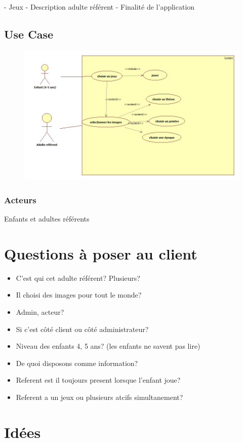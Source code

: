 \documentclass[12pt,a4paper]{report}
\begin{document}
- Jeux
- Description adulte référent
- Finalité de l'application



\section{Use Case}
\begin{figure}[!h]
 \centering
 \includegraphics[width=440px]{UseCase.jpg}
\end{figure}

\subsection{Acteurs}
Enfants et adultes référents

\chapter{Questions à poser au client}

\begin{itemize}
\item C'est qui cet adulte référent? Plusieurs?
\item Il choisi des images pour tout le monde?
\item Admin, acteur? 
\item Si c'est côté client ou côté administrateur? 
\item Niveau des enfants 4, 5 ans? (les enfants ne savent pas lire)
\item De quoi disposons comme information?
\item Referent est il toujours present lorsque l'enfant joue?
\item Referent a un jeux ou plusieurs atcifs simultanement?
\end{itemize}

\chapter{Idées}
\end{document}
